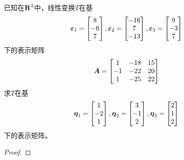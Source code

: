 \setcounter{problem}{30}
\begin{problem}
已知在\(\boldsymbol{\mathrm{R}}^3\)中，线性变换\(T\)在基
\begin{equation*}
    \boldsymbol{\varepsilon}_1=\begin{bmatrix}8\\-6\\7\end{bmatrix},
    \boldsymbol{\varepsilon}_2=\begin{bmatrix}-16\\7\\-13\end{bmatrix},
    \boldsymbol{\varepsilon}_3=\begin{bmatrix}9\\-3\\7\end{bmatrix}
\end{equation*}
下的表示矩阵
\begin{equation*}
    \boldsymbol{A}=
    \begin{bmatrix}
        1  & -18 & 15 \\
        -1 & -22 & 20 \\
        1  & -25 & 22
    \end{bmatrix}
\end{equation*}
求\(T\)在基
\begin{equation*}
    \boldsymbol{\eta}_1=\begin{bmatrix}1\\-2\\1\end{bmatrix},
    \boldsymbol{\eta}_2=\begin{bmatrix}3\\-1\\2\end{bmatrix},
    \boldsymbol{\eta}_3=\begin{bmatrix}2\\1\\2\end{bmatrix}
\end{equation*}
下的表示矩阵。
\end{problem}
\begin{proof}

\end{proof}

